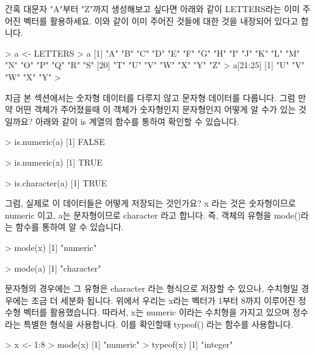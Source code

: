 \documentclass[tutorial.tex]{subfiles}
\begin{document}
간혹 대문자 "A"부터 "Z"까지 생성해보고 싶다면 아래와 같이 LETTERS라는 이미 주어진 벡터를 활용하세요.
이와 같이 이미 주어진 것들에 대한 것을 내장되어 있다고 합니다. 


\begin{Schunk}
\begin{Soutput}
> a <- LETTERS
> a
 [1] "A" "B" "C" "D" "E" "F" "G" "H" "I" "J" "K" "L" "M" "N" "O" "P" "Q" "R" "S"
[20] "T" "U" "V" "W" "X" "Y" "Z"
> a[21:25]
[1] "U" "V" "W" "X" "Y"
> 
\end{Soutput}
\end{Schunk}

지금 본 섹션에서는 숫자형 데이터를 다루지 않고 문자형 데이터를 다룹니다. 
그럼 만약 어떤 객체가 주어졌을때 이 객체가 숫자형인지 문자형인지 어떻게 알 수가 있는 것일까요?
아래와 같이 is 계열의 함수를 통하여 확인할 수 있습니다. 

\begin{Schunk}
\begin{Soutput}
> is.numeric(a)
[1] FALSE

> is.numeric(x)
[1] TRUE

> is.character(a)
[1] TRUE
\end{Soutput}
\end{Schunk}

그럼, 실제로 이 데이터들은 어떻게 저장되는 것인가요? x 라는 것은 숫자형이므로 numeric 이고, a는 문자형이므로 character 라고 합니다. 
즉, 객체의 유형을 mode()라는 함수를 통하여 알 수 있습니다.  

\begin{Schunk}
\begin{Soutput}
> mode(x)
[1] "numeric"

> mode(a)
[1] "character"

\end{Soutput}
\end{Schunk}

문자형의 경우에는 그 유형은 character 라는 형식으로 저장할 수 있으나, 수치형일 경우에는 조금 더 세분화 됩니다. 
위에서 우리는 x라는 벡터가 1부터 8까지 이루어진 정수형 벡터를 활용했습니다.
따라서, x는 numeric 이라는 수치형을 가지고 있으며 정수라는 특별한 형식을 사용합니다. 
이를 확인할때 typeof() 라는 함수를 사용합니다. 

\begin{Schunk}
\begin{Soutput}
> x <- 1:8
> mode(x)
[1] "numeric"
> typeof(x)
[1] "integer"
\end{Soutput}
\end{Schunk}
\end{document}
